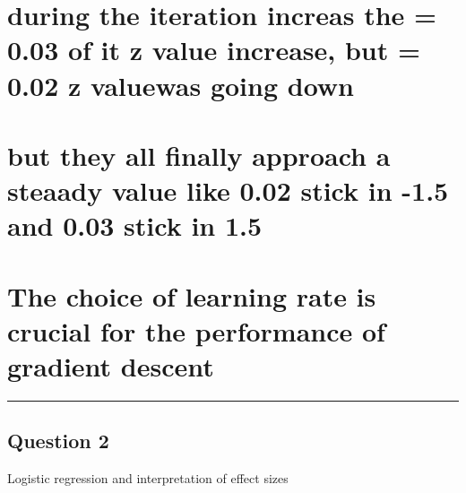\documentclass[
  letterpaper,
  DIV=11,
  numbers=noendperiod]{scrartcl}
\begin{document}
\hypertarget{during-the-iteration-increas-the-0.03-of-it-z-value-increase-but-0.02-z-valuewas-going-down}{%
\section{\texorpdfstring{during the iteration increas the \eta = 0.03 of
it z value increase, but \eta = 0.02 z valuewas going
down}{during the iteration increas the = 0.03 of it z value increase, but = 0.02 z valuewas going down}}\label{during-the-iteration-increas-the-0.03-of-it-z-value-increase-but-0.02-z-valuewas-going-down}}

\hypertarget{but-they-all-finally-approach-a-steaady-value-like-0.02-stick-in--1.5-and-0.03-stick-in-1.5}{%
\section{but they all finally approach a steaady value like 0.02 stick
in -1.5 and 0.03 stick in
1.5}\label{but-they-all-finally-approach-a-steaady-value-like-0.02-stick-in--1.5-and-0.03-stick-in-1.5}}

\hypertarget{the-choice-of-learning-rate-is-crucial-for-the-performance-of-gradient-descent}{%
\section{The choice of learning rate is crucial for the performance of
gradient
descent}\label{the-choice-of-learning-rate-is-crucial-for-the-performance-of-gradient-descent}}

\begin{center}\rule{0.5\linewidth}{0.5pt}\end{center}

\hypertarget{question-2}{%
\subsection{Question 2}\label{question-2}}

\begin{tcolorbox}[enhanced jigsaw, leftrule=.75mm, left=2mm, coltitle=black, rightrule=.15mm, titlerule=0mm, colbacktitle=quarto-callout-tip-color!10!white, toprule=.15mm, bottomrule=.15mm, opacityback=0, arc=.35mm, colframe=quarto-callout-tip-color-frame, title=\textcolor{quarto-callout-tip-color}{\faLightbulb}\hspace{0.5em}{50 points}, opacitybacktitle=0.6, toptitle=1mm, breakable, bottomtitle=1mm, colback=white]

Logistic regression and interpretation of effect sizes

\end{tcolorbox}
\end{document}
